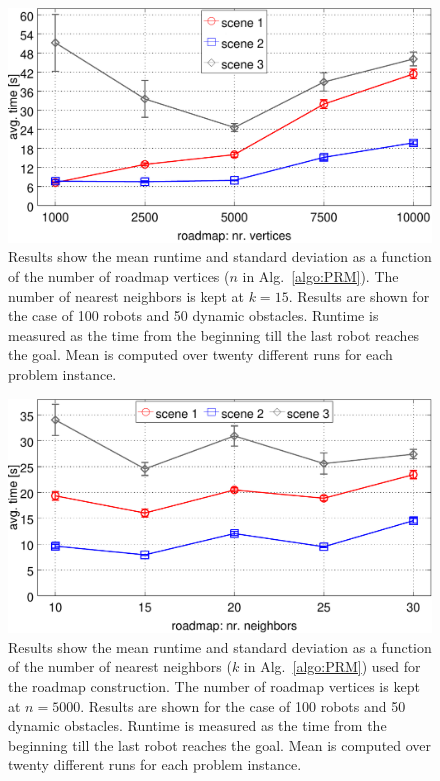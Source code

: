 \documentclass[letterpaper, 10pt, conference]{ieeeconf}
\begin{document}
\begin{figure}
\centering
\includegraphics[width=0.8\columnwidth]{usef/figResPRMnv}
\caption{Results show the mean runtime and standard deviation as a
  function of the number of roadmap vertices ($n$ in
  Alg.~\ref{algo:PRM}).
  The number of nearest neighbors is kept at $k=15$. Results are shown for
  the case of 100 robots and 50 dynamic obstacles.  Runtime is measured
  as the time from the beginning till the last robot reaches the
  goal. Mean is computed over twenty different runs for each problem
  instance.}
\label{fig:ResPRMnv}
\end{figure}

\begin{figure}
\centering
\includegraphics[width=0.8\columnwidth]{usef/figResPRMnn}
\caption{Results show the mean runtime and standard deviation as a
  function of the number of nearest neighbors ($k$ in
  Alg.~\ref{algo:PRM}) used for the roadmap construction.
  The number of   roadmap vertices is kept at $n=5000$. Results are shown for
  the case of 100 robots and 50 dynamic obstacles.  Runtime is measured
  as the time from the beginning till the last robot reaches the
  goal. Mean is computed over twenty different runs for each problem
  instance.}
\label{fig:ResPRMnn}
\end{figure}
\end{document}
